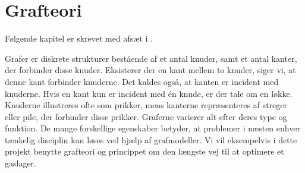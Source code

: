 \chapter{Grafteori}
Følgende kapitel er skrevet med afsæt i \citep{dmat}.

Grafer er diskrete strukturer bestående af et antal knuder, samt et antal kanter, der forbinder disse knuder. Eksisterer der en kant mellem to knuder, siger vi, at denne kant forbinder knuderne. Det kaldes også, at kanten er incident med knuderne. Hvis en kant kun er incident med én knude, er der tale om en løkke. Knuderne illustreres ofte som prikker, mens kanterne repræsenteres af streger eller pile, der forbinder disse prikker. Graferne varierer alt efter deres type og funktion. De mange forskellige egenskaber betyder, at problemer i næsten enhver tænkelig disciplin kan løses ved hjælp af grafmodeller. Vi vil eksempelvis i dette projekt benytte grafteori og princippet om den længste vej til at optimere et gaslager.















